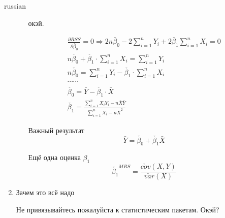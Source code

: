 \documentclass{article}
\begin{document}
\begin{otherlanguage*}{russian}
\begin{enumerate}
\begin{enumerate}
окэй.

\begin{align}
\frac{\partial RSS}{\partial \check{\beta_0}} = 0 \Rightarrow 2 n \check{\beta_0} - 2 \sum_{i=1}^n Y_i + 2 \check{\beta_1} \sum_{i=1}^n X_i = 0 \\
n \check{\beta_0} + \check{\beta_1} \cdot \sum_{i=1}^n X_i = \sum_{i=1}^n Y_i \\
n \check{\beta_0} = \sum_{i=1}^n Y_i - \check{\beta_1} \cdot \sum_{i=1}^n X_i  \\
\cdots \cdots \\ 
\check{\beta_0} = \bar{Y} - \check{\beta_1} \cdot \bar{X} \\
\check{\beta_1} = \frac{\sum_{i=1}^n X_i Y_i - n \bar{X} \bar{Y}}{\sum_{i=1}^n X_i - n \bar{X} ^ 2}
\end{align}

Важный результат 
\begin{equation}
\bar{Y} = \check{\beta_0} + \check{\beta_1} \bar{X} 
\end{equation}

Ещё одна оценка $\beta_1$ 
\begin{equation}
\check{\beta_1}^{MRS} = \frac{\check{cov} (X, Y)}{\check{var}(X)}
\end{equation}
\end{enumerate}
\item Зачем это всё надо 

Не привязывайтесь пожалуйста к статистическим пакетам. Окэй? 
\end{enumerate}
\end{otherlanguage*}
\end{document}
